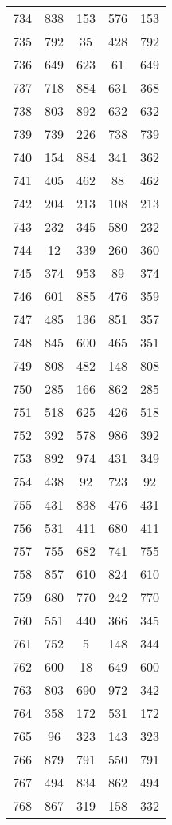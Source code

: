 \documentclass[a4paper,10pt,ngerman]{scrartcl}
\begin{document}
\begin{longtable}[c]{c|c|c|c|c}
    734 & 838 & 153 & 576 & 153 \\
    735 & 792 & 35 & 428 & 792 \\
    736 & 649 & 623 & 61 & 649 \\
    737 & 718 & 884 & 631 & 368 \\
    738 & 803 & 892 & 632 & 632 \\
    739 & 739 & 226 & 738 & 739 \\
    740 & 154 & 884 & 341 & 362 \\
    741 & 405 & 462 & 88 & 462 \\
    742 & 204 & 213 & 108 & 213 \\
    743 & 232 & 345 & 580 & 232 \\
    744 & 12 & 339 & 260 & 360 \\
    745 & 374 & 953 & 89 & 374 \\
    746 & 601 & 885 & 476 & 359 \\
    747 & 485 & 136 & 851 & 357 \\
    748 & 845 & 600 & 465 & 351 \\
    749 & 808 & 482 & 148 & 808 \\
    750 & 285 & 166 & 862 & 285 \\
    751 & 518 & 625 & 426 & 518 \\
    752 & 392 & 578 & 986 & 392 \\
    753 & 892 & 974 & 431 & 349 \\
    754 & 438 & 92 & 723 & 92 \\
    755 & 431 & 838 & 476 & 431 \\
    756 & 531 & 411 & 680 & 411 \\
    757 & 755 & 682 & 741 & 755 \\
    758 & 857 & 610 & 824 & 610 \\
    759 & 680 & 770 & 242 & 770 \\
    760 & 551 & 440 & 366 & 345 \\
    761 & 752 & 5 & 148 & 344 \\
    762 & 600 & 18 & 649 & 600 \\
    763 & 803 & 690 & 972 & 342 \\
    764 & 358 & 172 & 531 & 172 \\
    765 & 96 & 323 & 143 & 323 \\
    766 & 879 & 791 & 550 & 791 \\
    767 & 494 & 834 & 862 & 494 \\
    768 & 867 & 319 & 158 & 332 \\

\end{longtable}
\end{document}
